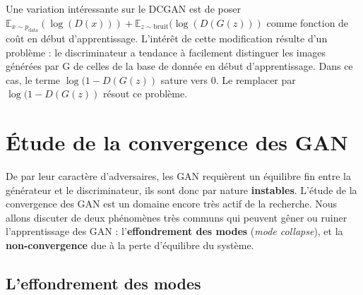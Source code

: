 Une variation intéressante sur le DCGAN est de poser $  \mathbb{E}_{x \sim p_{\mathrm{data}}}(\log (D(x))) + \mathbb{E}_{z \sim \mathrm{bruit}}(\log (D(G(z)))$ comme fonction de coût en début d'apprentissage. L'intérêt de cette modification résulte d'un problème : le discriminateur a tendance à facilement distinguer les images générées par G de celles de la base de donnée en début d'apprentissage. Dans ce cas, le terme $\log (1 - D(G(z))$ sature vers 0. Le remplacer par $\log (1 - D(G(z))$ résout ce problème.


\section{Étude de la convergence des GAN}

De par leur caractère d'adversaires, les GAN requièrent un équilibre fin entre la générateur et le discriminateur, ils sont donc par nature \textbf{instables}. L'étude de la convergence des GAN est un domaine encore très actif de la recherche. Nous allons discuter de deux phénomènes très communs qui peuvent gêner ou ruiner l'apprentissage des GAN : l'\textbf{effondrement des modes} (\textit{mode collapse}), et la \textbf{non-convergence} due à la perte d'équilibre du système.

\subsection{L'effondrement des modes}

